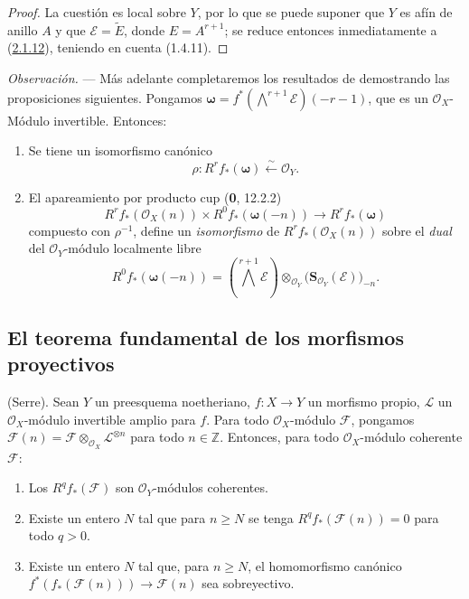 \begin{proof}
La cuestión es local sobre $Y$, por lo que se puede suponer que $Y$ es afín de anillo $A$ y que $\mathcal E=\widetilde E$, donde $E=A^{r+1}$; se reduce entonces inmediatamente a (\hyperref[III.2.1.12-fr]{2.1.12}), teniendo en cuenta (1.4.11).
\end{proof}

\begin{env}[2.1.16]
\label{III.2.1.16}
\label{III.2.1.16-fr}
\emph{Observación.} ---
Más adelante completaremos los resultados de  demostrando las proposiciones siguientes.
Pongamos
$\boldsymbol\omega=f^*(\bigwedge^{r+1}\mathcal E)(-r-1)$,
que es un $\mathcal O_X$-Módulo invertible. Entonces:
\begin{enumerate}
\item[{\rm(i)}] Se tiene un isomorfismo canónico
\begin{equation}
\label{III.2.1.16.1-fr}
\tag{2.1.16.1}
\rho:R^rf_*(\boldsymbol\omega)\xleftarrow{\sim}\mathcal O_Y.
\end{equation}
\item[{\rm(ii)}] El apareamiento por producto cup (\textbf{0}, 12.2.2)
\begin{equation}
\label{III.2.1.16.2-fr}
\tag{2.1.16.2}
R^rf_*(\mathcal O_X(n))\times R^0f_*(\boldsymbol\omega(-n))
\longrightarrow R^rf_*(\boldsymbol\omega)
\end{equation}
  compuesto con $\rho^{-1}$, define un \emph{isomorfismo} de $R^rf_*(\mathcal O_X(n))$ sobre el \emph{dual} del $\mathcal O_Y$-módulo localmente libre
  \[
R^0f_*(\boldsymbol\omega(-n))
=\left(\bigwedge^{r+1}\mathcal E\right)
\otimes_{\mathcal O_Y}\bigl(\mathbf S_{\mathcal O_Y}(\mathcal E)\bigr)_{-n}.
\]
\end{enumerate}
\end{env}

\subsection{El teorema fundamental de los morfismos proyectivos}
\label{subsection:III.2.2}
\label{subsection:III.2.2-fr}

\begin{theorem}[2.2.1]
\label{III.2.2.1-fr}
(Serre). Sean $Y$ un preesquema noetheriano, $f:X\to Y$ un morfismo propio, $\mathcal L$ un $\mathcal O_X$-módulo invertible amplio para $f$. Para todo $\mathcal O_X$-módulo $\mathcal F$, pongamos
$\mathcal F(n)=\mathcal F\otimes_{\mathcal O_X}\mathcal L^{\otimes n}$
para todo $n\in\mathbb Z$. Entonces, para todo $\mathcal O_X$-módulo coherente $\mathcal F$:
\begin{enumerate}
\item[{\rm(i)}] Los $R^qf_*(\mathcal F)$ son $\mathcal O_Y$-módulos coherentes.
\item[{\rm(ii)}] Existe un entero $N$ tal que para $n\geq N$ se tenga $R^qf_*(\mathcal F(n))=0$ para todo $q>0$.
\item[{\rm(iii)}] Existe un entero $N$ tal que, para $n\geq N$, el homomorfismo canónico
$f^*(f_*(\mathcal F(n)))\longrightarrow\mathcal F(n)$
sea sobreyectivo.
\end{enumerate}
\end{theorem}

